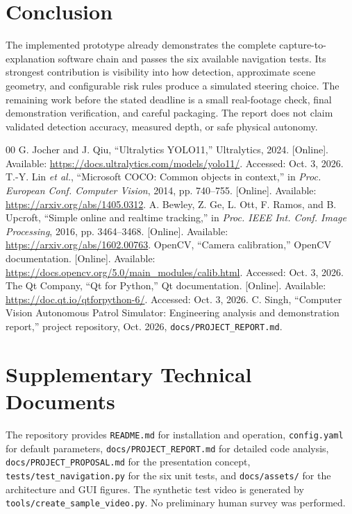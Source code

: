 \documentclass[conference,10pt]{IEEEtran}
\begin{document}
\section{Conclusion}
The implemented prototype already demonstrates the complete capture-to-explanation software chain and passes the six available navigation tests. Its strongest contribution is visibility into how detection, approximate scene geometry, and configurable risk rules produce a simulated steering choice. The remaining work before the stated deadline is a small real-footage check, final demonstration verification, and careful packaging. The report does not claim validated detection accuracy, measured depth, or safe physical autonomy.

\begin{thebibliography}{00}
 G. Jocher and J. Qiu, ``Ultralytics YOLO11,'' Ultralytics, 2024. [Online]. Available: \url{https://docs.ultralytics.com/models/yolo11/}. Accessed: Oct. 3, 2026.
 T.-Y. Lin \emph{et al.}, ``Microsoft COCO: Common objects in context,'' in \emph{Proc. European Conf. Computer Vision}, 2014, pp. 740--755. [Online]. Available: \url{https://arxiv.org/abs/1405.0312}.
 A. Bewley, Z. Ge, L. Ott, F. Ramos, and B. Upcroft, ``Simple online and realtime tracking,'' in \emph{Proc. IEEE Int. Conf. Image Processing}, 2016, pp. 3464--3468. [Online]. Available: \url{https://arxiv.org/abs/1602.00763}.
 OpenCV, ``Camera calibration,'' OpenCV documentation. [Online]. Available: \url{https://docs.opencv.org/5.0/main_modules/calib.html}. Accessed: Oct. 3, 2026.
 The Qt Company, ``Qt for Python,'' Qt documentation. [Online]. Available: \url{https://doc.qt.io/qtforpython-6/}. Accessed: Oct. 3, 2026.
 C. Singh, ``Computer Vision Autonomous Patrol Simulator: Engineering analysis and demonstration report,'' project repository, Oct. 2026, \texttt{docs/PROJECT\_REPORT.md}.
\end{thebibliography}

\appendices
\section{Supplementary Technical Documents}
The repository provides \texttt{README.md} for installation and operation, \texttt{config.yaml} for default parameters, \texttt{docs/PROJECT\_REPORT.md} for detailed code analysis, \texttt{docs/PROJECT\_PROPOSAL.md} for the presentation concept, \texttt{tests/test\_navigation.py} for the six unit tests, and \texttt{docs/assets/} for the architecture and GUI figures. The synthetic test video is generated by \texttt{tools/create\_sample\_video.py}. No preliminary human survey was performed.
\end{document}
